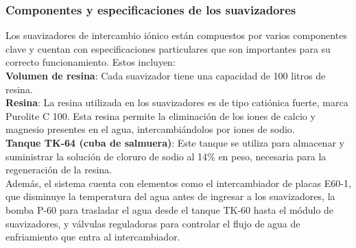 \subsubsection{Componentes y especificaciones de los suavizadores}

Los suavizadores de intercambio iónico están compuestos por varios componentes clave y cuentan con especificaciones particulares que son importantes para su correcto funcionamiento. Estos incluyen:\\

\textbf{Volumen de resina}: Cada suavizador tiene una capacidad de 100 litros de resina.\\

\textbf{Resina}: La resina utilizada en los suavizadores es de tipo catiónica fuerte, marca Purolite C 100. Esta resina permite la eliminación de los iones de calcio y magnesio presentes en el agua, intercambiándolos por iones de sodio.\\

\textbf{Tanque TK-64 (cuba de salmuera)}: Este tanque se utiliza para almacenar y suministrar la solución de cloruro de sodio al 14\% en peso, necesaria para la regeneración de la resina.\\

Además, el sistema cuenta con elementos como el intercambiador de placas E60-1, que disminuye la temperatura del agua antes de ingresar a los suavizadores, la bomba P-60 para trasladar el agua desde el tanque TK-60 hasta el módulo de suavizadores, y válvulas reguladoras para controlar el flujo de agua de enfriamiento que entra al intercambiador.
